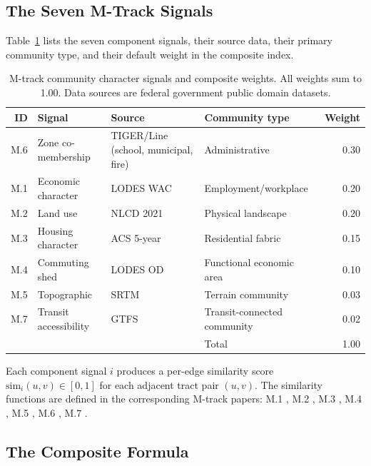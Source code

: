 \label{sec:background}

\subsection{The Seven M-Track Signals}

Table~\ref{tab:signals} lists the seven component signals, their source data,
their primary community type, and their default weight in the composite index.

\begin{table}[ht]
\centering
\caption{M-track community character signals and composite weights.
  All weights sum to 1.00.
  Data sources are federal government public domain datasets.}
\label{tab:signals}
\small
\begin{tabular}{rlllr}
\toprule
ID & Signal & Source & Community type & Weight \\
\midrule
M.6 & Zone co-membership & TIGER/Line (school, municipal, fire) & Administrative & 0.30 \\
M.1 & Economic character & LODES WAC & Employment/workplace & 0.20 \\
M.2 & Land use & NLCD 2021 & Physical landscape & 0.20 \\
M.3 & Housing character & ACS 5-year & Residential fabric & 0.15 \\
M.4 & Commuting shed & LODES OD & Functional economic area & 0.10 \\
M.5 & Topographic & SRTM & Terrain community & 0.03 \\
M.7 & Transit accessibility & GTFS & Transit-connected community & 0.02 \\
\midrule
 & & & Total & 1.00 \\
\bottomrule
\end{tabular}
\end{table}

Each component signal $i$ produces a per-edge similarity score
$\mathrm{sim}_i(u, v) \in [0, 1]$ for each adjacent tract pair $(u, v)$.
The similarity functions are defined in the corresponding M-track papers:
M.1 \citep{m1econchar}, M.2 \citep{m2landuse}, M.3 \citep{m3housing},
M.4 \citep{m4commute}, M.5 \citep{m5topo}, M.6 \citep{m6zone},
M.7 \citep{m7transit}.

\subsection{The Composite Formula}

